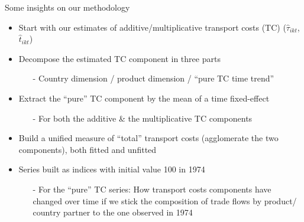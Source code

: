 \documentclass[10 pt,Helvetica, french]{beamer}
\begin{document}
\begin{frame} [label = slide_compeffects_strategy]
Some insights on our methodology \hyperlink{app_compeffects_strategy}{} \vspace{0.1cm}
\begin{itemize}
\item Start with our estimates of additive/multiplicative transport costs (TC) ($\widehat{\tau}_{ikt}$, $\widehat{t}_{ikt}$)\vspace{0.1cm}
\item Decompose the estimated TC component in three parts \vspace{0.1cm}
\begin{itemize}
\item[-] Country dimension / product dimension / ``pure TC time trend'' \vspace{0.1cm}
\end{itemize}
\item Extract the ``pure'' TC component by the mean of a time fixed-effect \vspace{0.1cm}
\begin{itemize}
\item[-] For both the additive \& the multiplicative TC components \vspace{0.1cm}
\end{itemize}
\item Build a unified measure of ``total'' transport costs (agglomerate the two components), both fitted and unfitted \vspace{0.1cm}
\item Series built as indices with initial value 100 in 1974 \vspace{0.1cm}
\begin{itemize}
\item[-] For the ``pure'' TC series: How transport costs components have changed over time if we stick the composition of trade flows by product/ country partner to the one observed in 1974
\end{itemize}
\end{itemize}
\end{frame}
\end{document}
